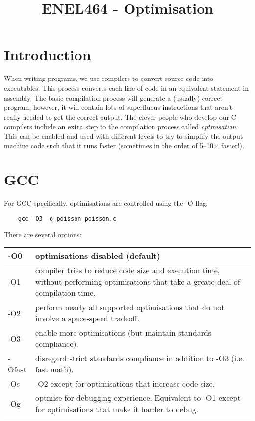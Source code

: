 \documentclass[a4paper,11pt]{article}
\begin{document}
\title{ \bf ENEL464 - Optimisation }
\author{}
\date{}
\maketitle


\section{Introduction}

When writing programs, we use compilers to convert source code into executables.
This process converts each line of code in an equivalent statement in assembly.
The basic compilation process will generate a (usually) correct program,
however, it will contain lots of superfluous instructions that aren't really
needed to get the correct output. The clever people who develop our C compilers
include an extra step to the compilation process called \emph{optmisation}. This
can be enabled and used with different levels to try to simplify the output
machine code such that it runs faster (sometimes in the order of 5--10$\times$
faster!).

\section{GCC}

For GCC specifically, optimisations are controlled using the -O flag:
\begin{verbatim}
    gcc -O3 -o poisson poisson.c
\end{verbatim}

There are several options:

\begin{centering}
    \begin{tabularx}{\linewidth}{ l  X }
        -O0 & optimisations disabled (default) \\ \hline
        -O1 & compiler tries to reduce code size and execution time, without
              performing optimisations that take a greate deal of compilation
              time. \\ \hline
        -O2 & perform nearly all supported optimisations that do not involve a
              space-speed tradeoff. \\ \hline
        -O3 & enable more optimisations (but maintain standards compliance). \\
              \hline
        -Ofast & disregard strict standards compliance in addition to -O3 (i.e.
                 fast math). \\ \hline
        -Os & -O2 except for optimisations that increase code size. \\ \hline
        -Og & optmise for debugging experience. Equivalent to -O1 except for
              optimisations that make it harder to debug. \\
    \end{tabularx}
\end{centering}
\end{document}
